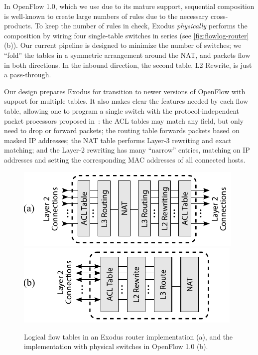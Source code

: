 In OpenFlow 1.0, which we use due to its mature support, sequential composition
is well-known to create large numbers of rules due to the necessary
cross-products.  To keep the number of rules in check, Exodus \emph{physically}
performs the composition by wiring four single-table switches in series (see
\autoref{fig:flowlog-router}(b)).
Our current pipeline is designed to minimize the number of switches; we
``fold'' the tables in a symmetric arrangement around the NAT, and packets flow
in both directions. In the inbound direction, the second table, L2 Rewrite, is
just a pass-through.

Our design prepares Exodus for transition to newer versions of OpenFlow with
support for multiple tables.  It also makes clear the features needed by each
flow table, allowing one to program a single switch with the
protocol-independent packet processors proposed
in~\cite{Bosshart:2013ppipp-arxiv}: the ACL tables may match any field, but
only need to drop or forward packets; the routing table forwards packets based
on masked IP addresses; the NAT table performs Layer-3 rewriting and exact
matching; and the Layer-2 rewriting has many ``narrow'' entries, matching on IP
addresses and setting the corresponding MAC addresses of all connected hosts.

\begin{figure}
  \centering
  \includegraphics[scale=0.9]{figs/flowlog-router-unfolded}
  \includegraphics[scale=0.9]{figs/flowlog-router-folded}
  \caption{Logical flow tables in an Exodus router implementation (a), and the implementation
with physical switches in OpenFlow 1.0 (b).}
  \label{fig:flowlog-router}
\end{figure}

